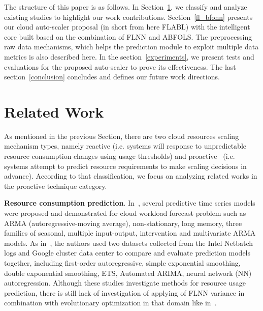 \documentclass[runningheads]{llncs}
\begin{document}
The structure of this paper is as follows. In Section~\ref{related_work}, we classify and analyze existing studies to highlight our work contributions. Section~\ref{fl_bfonn} presents our cloud auto-scaler proposal (in short from here FLABL) with the intelligent core built based on the combination of FLNN and ABFOLS. The preprocessing raw data mechanisms, which helps the prediction module to exploit multiple data metrics is also described here. In the section~\ref{experiments}, we present tests and evaluations for the proposed auto-scaler to prove its effectiveness. The last section~\ref{conclusion} concludes and defines our future work directions.

\section{Related Work}
\label{related_work}
 
As mentioned in the previous Section, there are two cloud resources scaling mechanism types, namely reactive (i.e. systems will response to unpredictable resource consumption changes using usage thresholds) and proactive~\cite{ref_lorido} (i.e. systems attempt to predict resource requirements to make scaling decisions in advance). According to that classification, we focus on analyzing related works in the proactive technique category. 


\textbf{Resource consumption prediction}. 
In~\cite{ref_hipel}, several predictive time series models were proposed and demonstrated for cloud workload forecast problem such as ARMA (autoregressive-moving average), non-stationary, long memory, three families of seasonal, multiple input-output, intervention and multivariate ARMA models. As in~\cite{ref_vazquez}, the authors used two datasets collected from the Intel Netbatch logs and Google cluster data center to compare and evaluate prediction models together, including first-order autoregressive, simple exponential smoothing, double exponential smoothing, ETS, Automated ARIMA, neural network (NN) autoregression. Although these studies investigate methods for resource usage prediction, there is still lack of investigation of applying of FLNN variance in combination with evolutionary optimization in that domain like in~\cite{ref_thieu}.
\end{document}
